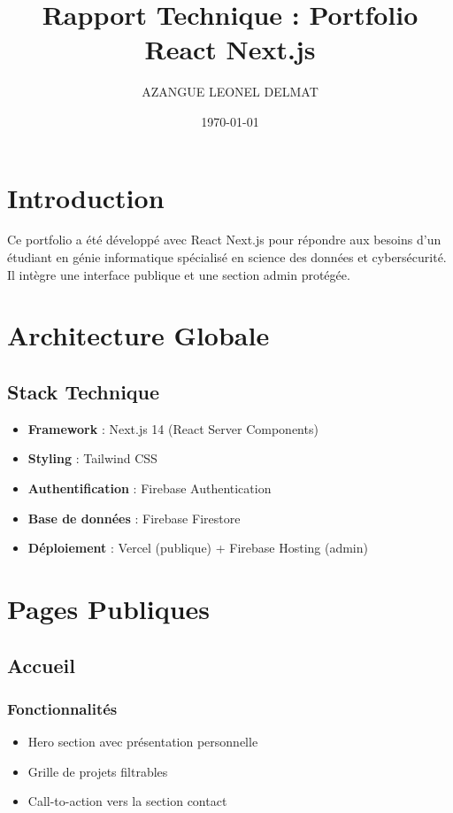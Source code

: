 \documentclass[12pt,a4paper]{report}
\title{Rapport Technique : Portfolio React Next.js}
\author{AZANGUE LEONEL DELMAT}
\date{\today}
\begin{document}
\maketitle

\tableofcontents

\chapter{Introduction}
Ce portfolio a été développé avec React Next.js pour répondre aux besoins d'un étudiant en génie informatique spécialisé en science des données et cybersécurité. Il intègre une interface publique et une section admin protégée.

\chapter{Architecture Globale}
\section{Stack Technique}
\begin{itemize}
\item \textbf{Framework} : Next.js 14 (React Server Components)
\item \textbf{Styling} : Tailwind CSS
\item \textbf{Authentification} : Firebase Authentication
\item \textbf{Base de données} : Firebase Firestore
\item \textbf{Déploiement} : Vercel (publique) + Firebase Hosting (admin)
\end{itemize}

\chapter{Pages Publiques}
\section{Accueil}
\subsection{Fonctionnalités}
\begin{itemize}
\item Hero section avec présentation personnelle
\item Grille de projets filtrables
\item Call-to-action vers la section contact
\end{itemize}
\end{document}
